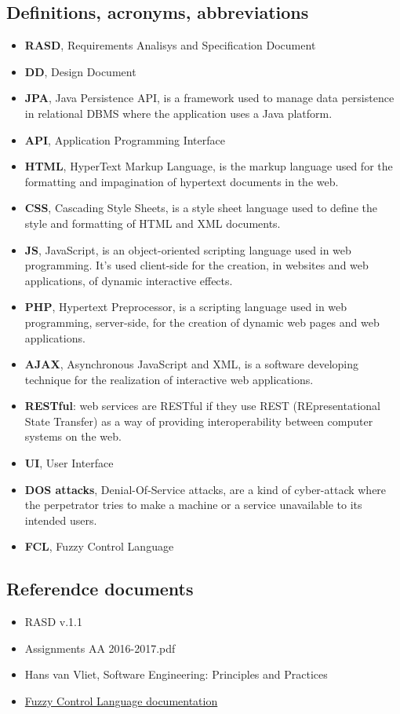 \subsection{Definitions, acronyms, abbreviations}
	\begin{itemize}
		\item \textbf{RASD}, Requirements Analisys and Specification Document
		\item \textbf{DD}, Design Document
		\item \textbf{JPA}, Java Persistence API, is a framework used to manage data persistence in relational DBMS where the application uses a Java platform.
		\item \textbf{API}, Application Programming Interface
		\item \textbf{HTML}, HyperText Markup Language, is the markup language used for the formatting and impagination of hypertext documents in the web.
		\item \textbf{CSS}, Cascading Style Sheets, is a style sheet language used to define the style and formatting of HTML and XML documents.
		\item \textbf{JS}, JavaScript, is an object-oriented scripting language used in web programming. It's used client-side for the creation, in websites and web applications, of dynamic interactive effects.
		\item \textbf{PHP}, Hypertext Preprocessor, is a scripting language used in web programming, server-side, for the creation of dynamic web pages and web applications.
		\item \textbf{AJAX}, Asynchronous JavaScript and XML, is a software developing technique for the realization of interactive web applications.
		\item \textbf{RESTful}: web services are RESTful if they use REST (REpresentational State Transfer) as a way of providing interoperability between computer systems on the web.
		\item \textbf{UI}, User Interface
		\item \textbf{DOS attacks}, Denial-Of-Service attacks, are a kind of cyber-attack where the perpetrator tries to make a machine or a service unavailable to its intended users.
		\item \textbf{FCL}, Fuzzy Control Language
	\end{itemize}

\subsection{Referendce documents}
	\begin{itemize}
		\item RASD v.1.1
		\item Assignments AA 2016-2017.pdf
		\item Hans van Vliet, Software Engineering: Principles and Practices
		\item \href{http://ffll.sourceforge.net/fcl.htm}{Fuzzy Control Language documentation}
	\end{itemize}

